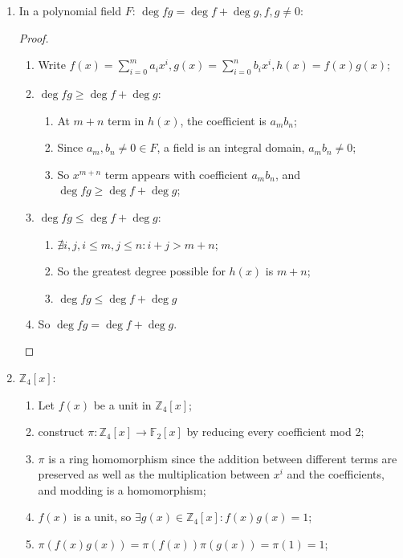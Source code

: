 \documentclass{article}
\begin{document}
\begin{enumerate}
    \item In a polynomial field $F$: $\deg fg=\deg f+\deg g,f,g\ne 0$:
    \begin{proof}
    ~
        \begin{enumerate}
            \item Write $f(x)=\sum_{i=0}^m a_ix^i,g(x)=\sum_{i=0}^n b_ix^i,h(x)=f(x)g(x)$;
            \item $\deg fg\geq \deg f+\deg g$:
            \begin{enumerate}
                \item At $m+n$ term in $h(x)$, the coefficient is $a_mb_n$;
                \item Since $a_m,b_n\ne0\in F$, a field is an integral domain, $a_mb_n\ne 0$;
                \item So $x^{m+n}$ term appears with coefficient $a_mb_n$, and $\deg fg\geq \deg f+\deg g$;
            \end{enumerate}
            \item $\deg fg\leq \deg f+\deg g$:
            \begin{enumerate}
                \item $\nexists i,j,i\leq m,j\leq n:i+j>m+n$;
                \item So the greatest degree possible for $h(x)$ is $m+n$;
                \item $\deg fg\leq \deg f+\deg g$
            \end{enumerate}
            \item So $\deg fg=\deg f+\deg g$.
        \end{enumerate}
    \end{proof}
    \item $\mathbb{Z}_4[x]$:
    \begin{enumerate}
        \item Let $f(x)$ be a unit in $\mathbb{Z}_4[x]$;
        \item construct $\pi:\mathbb{Z}_4[x]\to\mathbb{F}_2[x]$ by reducing every coefficient mod 2;
        \item $\pi$ is a ring homomorphism since the addition between different terms are preserved as well as the multiplication between $x^i$ and the coefficients, and modding is a homomorphism;
        \item $f(x)$ is a unit, so $\exists g(x)\in\mathbb{Z}_4[x]:f(x)g(x)=1$;
        \item $\pi(f(x)g(x))=\pi(f(x))\pi(g(x))=\pi(1)=1$;

\end{enumerate}
\end{enumerate}
\end{document}
